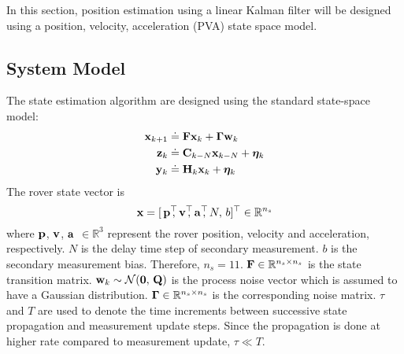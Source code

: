 In this section, position estimation using a linear Kalman filter will be designed using a position, velocity, acceleration (PVA) state space model.

\subsection{System Model}
The state estimation algorithm are designed using the standard state-space model:
\begin{align} \label{eqn:state_prop_model}
	\mathbf{x}_{k+1} &\doteq \mathbf{F} \mathbf{x}_k + \boldsymbol{\Gamma} \mathbf{w}_k \\
	\label{eqn:delayed_msr_update_model}
	\mathbf{z}_k &\doteq \mathbf{C}_{k-N} \mathbf{x}_{k-N} + \boldsymbol{\eta}_k	\\
	\label{eqn:msr_update_model}
	\mathbf{y}_k &\doteq \mathbf{H}_k \mathbf{x}_k + \boldsymbol{\eta}_k	
\end{align} 
The rover state vector is 
\begin{equation} \label{eqn:state_vector}
	\Boldx = [\,\Boldp^\top \!\!\!, \, \Boldv^\top \!\!\!, \, \Bolda^\top \!\!\!, \, N, \, b]^\top 
	\in \mathbb{R}^{n_s}
\end{equation}
where $\mathbf{p}$, $\mathbf{v}$, $\mathbf{a}$ $\in \mathbb{R}^3$ represent the rover position, velocity and acceleration, respectively. $N$ is the delay time step of secondary measurement. $b$ is the secondary measurement bias. 
Therefore, $n_s = 11$. $\mathbf{F} \in \mathbb{R}^{n_s \times n_s}$ is the state transition matrix.
$\mathbf{w}_k \sim \mathcal{N}(\boldsymbol{0},\,\mathbf{Q})$ is the process noise vector which is assumed to have a Gaussian distribution. $\boldsymbol{\Gamma} \in \mathbb{R}^{n_s \times n_s}$ is the corresponding noise matrix. $\tau$ and $T$ are used to denote the time increments between successive state propagation and measurement update steps. 
Since the propagation is done at higher rate compared to measurement update, $\tau \ll T$.

